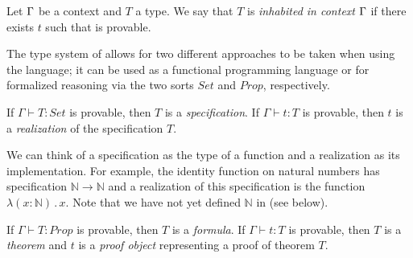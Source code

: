 


\begin{defnc}
\label{def:inhabited}
Let $\Gamma{}$ be a context and $T$ a type. We say that $T$ is \emph{inhabited in context} $\Gamma{}$ if there exists $t$ such that  is provable.
\end{defnc}


The type system of \coc{} allows for two different approaches to be taken when using the language; it can be used as a functional programming language or for formalized reasoning via the two sorts $\mathit{Set}$ and $\mathit{Prop}$, respectively.

\begin{defnc}
\label{def:spec}
If $\Gamma \vdash T : \mathit{Set}$ is provable, then $T$ is a \emph{specification}. If $\Gamma \vdash t : T$ is provable, then $t$ is a \emph{realization} of the specification $T$.
\end{defnc}

We can think of a specification as the type of a function and a realization as its implementation. For example, the identity function on natural numbers has specification $\mathbb{N} \rightarrow \mathbb{N}$ and a realization of this specification is the function $\lambda (x : \mathbb{N}) \, . \, x$. Note that we have not yet defined $\mathbb{N}$ in \coc{} (see below).

\begin{defnc}
\label{def:thmpf}
If $\Gamma \vdash T : \mathit{Prop}$ is provable, then $T$ is a \emph{formula}. If $\Gamma \vdash t : T$ is provable, then $T$ is a \emph{theorem} and $t$ is a \emph{proof object} representing a proof of theorem $T$.
\end{defnc}

